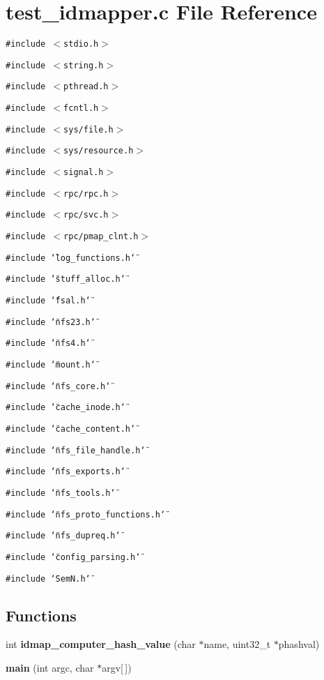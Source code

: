 \section{test\_\-idmapper.c File Reference}
\label{test__idmapper_8c}
{\tt \#include $<$stdio.h$>$}\par
{\tt \#include $<$string.h$>$}\par
{\tt \#include $<$pthread.h$>$}\par
{\tt \#include $<$fcntl.h$>$}\par
{\tt \#include $<$sys/file.h$>$}\par
{\tt \#include $<$sys/resource.h$>$}\par
{\tt \#include $<$signal.h$>$}\par
{\tt \#include $<$rpc/rpc.h$>$}\par
{\tt \#include $<$rpc/svc.h$>$}\par
{\tt \#include $<$rpc/pmap\_\-clnt.h$>$}\par
{\tt \#include \char`\"{}log\_\-functions.h\char`\"{}}\par
{\tt \#include \char`\"{}stuff\_\-alloc.h\char`\"{}}\par
{\tt \#include \char`\"{}fsal.h\char`\"{}}\par
{\tt \#include \char`\"{}nfs23.h\char`\"{}}\par
{\tt \#include \char`\"{}nfs4.h\char`\"{}}\par
{\tt \#include \char`\"{}mount.h\char`\"{}}\par
{\tt \#include \char`\"{}nfs\_\-core.h\char`\"{}}\par
{\tt \#include \char`\"{}cache\_\-inode.h\char`\"{}}\par
{\tt \#include \char`\"{}cache\_\-content.h\char`\"{}}\par
{\tt \#include \char`\"{}nfs\_\-file\_\-handle.h\char`\"{}}\par
{\tt \#include \char`\"{}nfs\_\-exports.h\char`\"{}}\par
{\tt \#include \char`\"{}nfs\_\-tools.h\char`\"{}}\par
{\tt \#include \char`\"{}nfs\_\-proto\_\-functions.h\char`\"{}}\par
{\tt \#include \char`\"{}nfs\_\-dupreq.h\char`\"{}}\par
{\tt \#include \char`\"{}config\_\-parsing.h\char`\"{}}\par
{\tt \#include \char`\"{}SemN.h\char`\"{}}\par
\subsection*{Functions}
\begin{CompactItemize}
\item 
int {\bf idmap\_\-computer\_\-hash\_\-value} (char $\ast$name, uint32\_\-t $\ast$phashval)
\item 
{\bf main} (int argc, char $\ast$argv[$\,$])
\end{CompactItemize}
